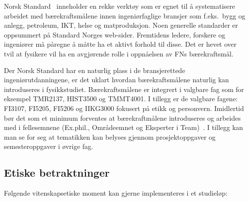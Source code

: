 \documentclass{article}
\begin{document}
Norsk Standard~\cite{StandardNorge} inneholder en rekke verktøy som er egnet til å systematisere arbeidet med bærekraftsmålene innen ingeniørfaglige bransjer som f.eks.~bygg og anlegg, petroleum, IKT, helse og matproduksjon.
Noen generelle standarder er oppsummert på Standard Norges web-sider.
Fremtidens ledere, forskere og ingeniører må påregne å måtte ha et aktivt forhold til disse.
Det er hevet over tvil at fysikere vil ha en avgjørende rolle i oppnåelsen av FNs bærekraftsmål.

Der Norsk Standard har en naturlig plass i de bransjerettede ingeniørutdanningene, er det uklart hvordan bærekraftsmålene naturlig kan introduseres i fysikkstudiet. Bærekraftsmålene er integrert i valgbare fag som for eksempel TMR2137, HIST3500 og TMMT4001. I tillegg er de valgbare fagene: FI3107, FI5205, FI5206 og IIKG3000 fokusert på etikk og personvern. Imidlertid bør det som et minimum forventes at bærekraftmålene introduseres og arbeides med i fellesemnene (Ex.phil., Områdeemnet og Eksperter i Team)~\cite{NTNUFellesEmner}.
I tillegg kan man se for seg at tematikken kan belyses gjennom prosjektoppgaver og semesteroppgaver i øvrige fag.

\subsection{Etiske betraktninger}
Følgende vitenskapsetiske moment kan gjerne implementeres i et studieløp:
\end{document}
